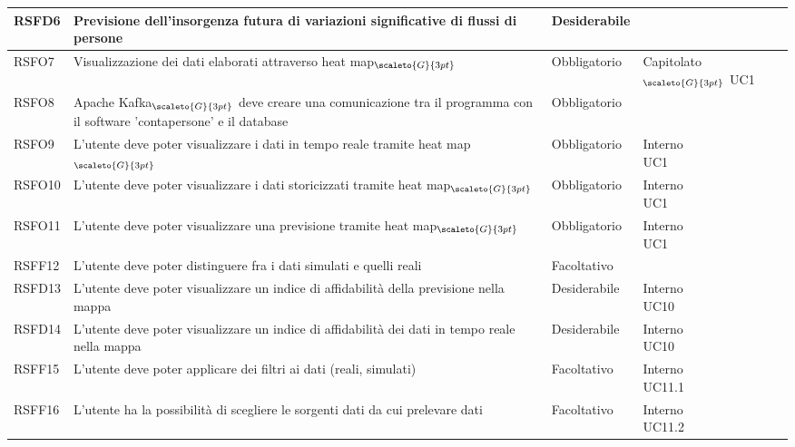 {\begin{center}
\begin{longtable}{|p{2.5cm}|p{4.5cm}|p{3.5cm}|p{4cm}|}
			\hline
			\centering RSFD6 & Previsione dell'insorgenza futura di variazioni significative di flussi di persone & \centering Desiderabile & \makecell[tc]{Capitolato$_{\scaleto{G}{3pt}}$ }  \\
			\hline
			\centering RSFO7 & Visualizzazione dei dati elaborati attraverso heat map$_{\scaleto{G}{3pt}}$ &\centering  Obbligatorio & \makecell[tc]{Capitolato$_{\scaleto{G}{3pt}}$ \\ UC1}  \\
			\hline
			\centering RSFO8 & Apache Kafka$_{\scaleto{G}{3pt}}$ deve creare una comunicazione tra il programma con il software 'contapersone' e il database  &\centering  Obbligatorio &  \makecell[tc]{Interno} 	\\
			\hline
			\centering RSFO9 & L'utente deve poter visualizzare i dati in tempo reale tramite heat map$_{\scaleto{G}{3pt}}$  &\centering  Obbligatorio &  \makecell[tc]{Interno \\ UC1} 	\\
			\hline
			\centering RSFO10 & L'utente deve poter visualizzare i dati storicizzati tramite heat map$_{\scaleto{G}{3pt}}$  &\centering  Obbligatorio &  \makecell[tc]{Interno \\ UC1} 	\\
			\hline
			\centering RSFO11 & L'utente deve poter visualizzare una previsione tramite heat map$_{\scaleto{G}{3pt}}$  &\centering  Obbligatorio &  \makecell[tc]{Interno \\ UC1} 	\\
			\hline
			\centering RSFF12 & L'utente deve poter distinguere fra i dati simulati e quelli reali  &\centering  Facoltativo &  \makecell[tc]{Interno} 	\\
			\hline
			\centering RSFD13 & L'utente deve poter visualizzare un indice di affidabilità della previsione nella mappa  &\centering  Desiderabile &  \makecell[tc]{Interno \\ UC10} 	\\
			\hline
			\centering RSFD14 & L'utente deve poter visualizzare un indice di affidabilità dei dati in tempo reale nella mappa  &\centering  Desiderabile &  \makecell[tc]{Interno \\ UC10} 	\\
			\hline
			\centering RSFF15 & L'utente deve poter applicare dei filtri ai dati (reali, simulati)  &\centering  Facoltativo &  \makecell[tc]{Interno \\ UC11.1 } 	\\
			\hline
			\centering RSFF16 & L'utente ha la possibilità di scegliere le sorgenti dati da cui prelevare dati  &\centering  Facoltativo &  \makecell[tc]{Interno \\ UC11.2} 	\\

\end{longtable}
\end{center}}
